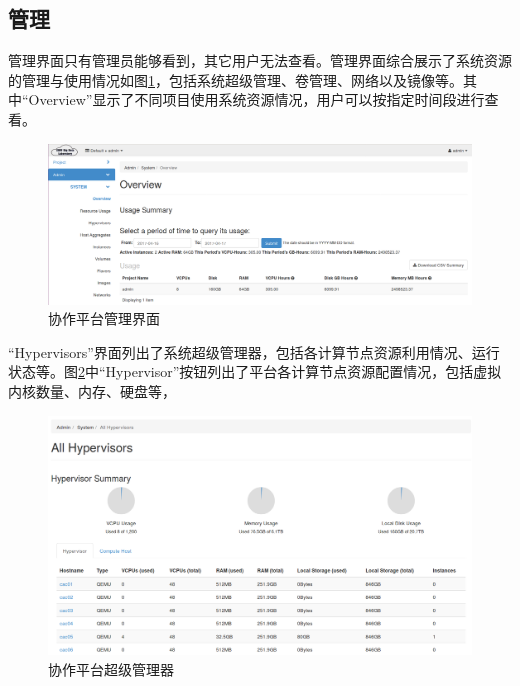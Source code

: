 \documentclass[12pt]{ctexart}%
\begin{document}
\subsection{管理}
管理界面只有管理员能够看到，其它用户无法查看。管理界面综合展示了系统资源的管理与使用情况如图\ref{fig:adminsystemoverview}，包括系统超级管理、卷管理、网络以及镜像等。其中``Overview''显示了不同项目使用系统资源情况，用户可以按指定时间段进行查看。
\begin{figure}[!htb]
\centering
\includegraphics[width=6in]{./figures/Admin_System_Overview}
\caption{协作平台管理界面}
\label{fig:adminsystemoverview}
\end{figure}

``Hypervisors''界面列出了系统超级管理器，包括各计算节点资源利用情况、运行状态等。图\ref{fig:adminsystemhypervisors}中``Hypervisor''按钮列出了平台各计算节点资源配置情况，包括虚拟内核数量、内存、硬盘等，
\begin{figure}[!htb]
\centering
\includegraphics[width=6in]{./figures/Admin_System_Hypervisors}
\caption{协作平台超级管理器}
\label{fig:adminsystemhypervisors}
\end{figure}
\end{document}
